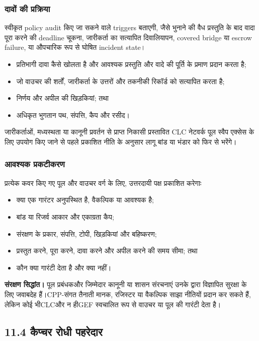 \documentclass[11pt]{article}
\begin{document}
\subsubsection*{दावों की प्रक्रिया}

स्वीकृत policy audit किए जा सकने वाले triggers बताएगी, जैसे भुनाने की वैध प्रस्तुति के बाद वादा पूरा करने की deadline चूकना, जारीकर्ता का सत्यापित दिवालियापन, covered bridge या escrow failure, या औपचारिक रूप से घोषित incident state।

\begin{itemize}[leftmargin=*]
\item प्रतिभागी दावा कैसे खोलता है और आवश्यक प्रस्तुति और वादे की पूर्ति के प्रमाण प्रदान करता है;
\item जो वाउचर की शर्तों, जारीकर्ता के उत्तरों और तकनीकी रिकॉर्ड को सत्यापित करता है;
\item निर्णय और अपील की खिड़कियां; तथा
\item अधिकृत भुगतान पथ, संपत्ति, कैप और रसीद।
\end{itemize}
जारीकर्ताओं, मध्यस्थता या कानूनी प्रवर्तन से प्राप्त निकासी प्रस्तावित CLC नेटवर्क पूल स्वैप एक्सेस के लिए उपयोग किए जाने से पहले प्रकाशित नीति के अनुसार लागू बांड या भंडार को फिर से भरेंगे।

\subsubsection*{आवश्यक प्रकटीकरण}

प्रत्येक कवर किए गए पूल और वाउचर वर्ग के लिए, उत्तरदायी पक्ष प्रकाशित करेगाः

\begin{itemize}[leftmargin=*]
\item क्या एक गारंटर अनुपस्थित है, वैकल्पिक या आवश्यक है;
\item बांड या रिजर्व आकार और एकाग्रता कैप;
\item संरक्षण के प्रकार, संपत्ति, टोपी, खिड़कियां और बहिष्करण;
\item प्रस्तुत करने, पूरा करने, दावा करने और अपील करने की समय सीमा; तथा
\item कौन क्या गारंटी देता है और क्या नहीं।
\end{itemize}
\textbf{संरक्षण सिद्धांत।} पूल प्रबंधकऔर जिम्मेदार कानूनी या शासन संरचनाएं उनके द्वारा विज्ञापित सुरक्षा के लिए जवाबदेह हैं।CPP-संगत तैनाती मानक, रजिस्टर या वैकल्पिक साझा नीतियों प्रदान कर सकते हैं, लेकिन कोई भीCLCऔर न हीGEF स्वचालित रूप से वाउचर या पूल की गारंटी देता है।

\subsection*{11.4 कैप्चर रोधी पहरेदार}
\end{document}
